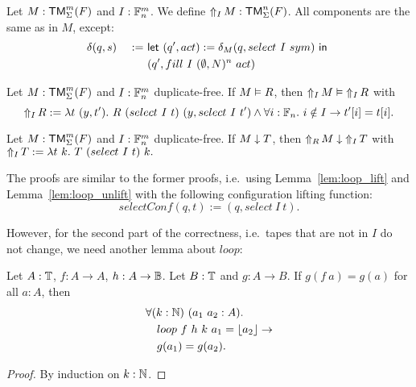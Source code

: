 \begin{definition}[$\LiftTapes{M}{I}$][LiftTapes]
  \label{def:LiftTapes}
  Let $M:\TM_\Sigma^m(F)$ and $I : \Fin_n^m$.  We define $\LiftTapes{M}{I} : \TM_\Sigma^n(F)$.  All components are the same as in $M$, except:
  \begin{alignat*}{2}
    &\delta(q,s) &~:=~& \Let{(q', act) := \delta_M(q, select~I~sym)}{\\%
    &            &~  ~& (q', fill~I~(\None,N)^n~act)}
  \end{alignat*}
\end{definition}

\begin{lemma}
  \label{lem:LiftTapes_Realise}
  Let $M : \TM_\Sigma^m(F)$ and $I : \Fin_n^m$ duplicate-free.  If $M \Realise R$, then $\LiftTapes{M}{I} \Realise \LiftTapes{R}{I}$ with
  \[
    \LiftTapes{R}{I} := \lambda t~(y,t').~ R~(select~I~t)~(y, select~I~t') \land \forall i:\Fin_n.~i \notin I \rightarrow t'[i]=t[i].
  \]
\end{lemma}

\begin{lemma}
  \label{lem:LiftTapes_TerminatesIn}
  Let $M : \TM_\Sigma^m(F)$ and $I : \Fin_n^m$ duplicate-free. If $M \TerminatesIn T$, then $\LiftTapes{M}{R} \TerminatesIn \LiftTapes{T}{I}$ with
  $ \LiftTapes{T}{I} := \lambda t~k.~ T~(select~I~t)~k.  $
\end{lemma}

The proofs are similar to the former proofs, i.e.\ using Lemma~\ref{lem:loop_lift} and Lemma~\ref{lem:loop_unlift} with the following configuration
lifting function:
\[
  selectConf(q,t) := (q, select~I~t).
\]

However, for the second part of the correctness, i.e.\ tapes that are not in $I$ do not change, we need another lemma about $loop$:

\begin{lemma}
  \label{lem:loop_map}
  Let $A:\Type$, $f:A \to A$, $h:A \to \Bool$.  Let $B:\Type$ and $g : A \to B$.  If $g(f~a)=g(a)$ for all $a:A$, then
  \begin{alignat*}{1}
    & \forall (k:\Nat)~(a_1~a_2 : A). \\
    & \quad loop~f~h~k~a_1 = \Some{a_2} \rightarrow \\
    & \quad g(a_1) = g(a_2).
  \end{alignat*}
\end{lemma}
\begin{proof}
  By induction on $k:\Nat$.
\end{proof}

